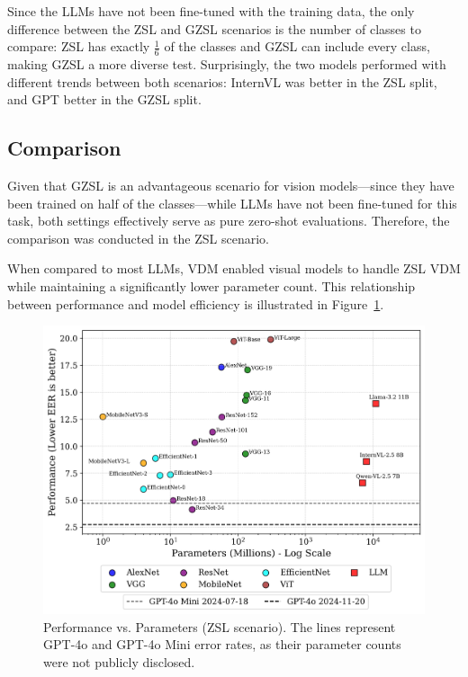 Since the \glspl{LLM} have not been fine-tuned with the training data, the only difference between the \gls{ZSL} and \gls{GZSL} scenarios is the number of classes to compare: \gls{ZSL} has exactly $\tfrac{1}{6}$ of the classes and \gls{GZSL} can include every class, making \gls{GZSL} a more diverse test. Surprisingly, the two models performed with different trends between both scenarios: InternVL was better in the \gls{ZSL} split, and GPT better in the \gls{GZSL} split.

\subsection{Comparison}
\label{sec:comparison_result}

Given that \gls{GZSL} is an advantageous scenario for vision models—since they have been trained on half of the classes—while \glspl{LLM} have not been fine-tuned for this task, both settings effectively serve as pure zero-shot evaluations. Therefore, the comparison was conducted in the \gls{ZSL} scenario.

When compared to most \glspl{LLM}, \gls{VDM} enabled visual models to handle \gls{ZSL} \gls{VDM} while maintaining a significantly lower parameter count. This relationship between performance and model efficiency is illustrated in Figure~\ref{fig:performance}.

\begin{figure}[htbp]
\centering
\includegraphics[width=1\linewidth]{images/performance_vs_parameters.png}
\caption{Performance vs. Parameters (\acrlong{ZSL} scenario)\label{fig:performance}. The lines represent GPT-4o and GPT-4o Mini error rates, as their parameter counts were not publicly disclosed.}
\end{figure}  

